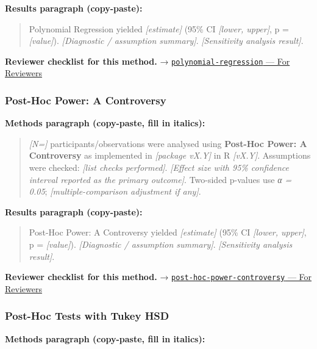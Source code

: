 \documentclass[
]{article}
\begin{document}
\textbf{Results paragraph (copy-paste):}

\begin{quote}
Polynomial Regression yielded \emph{{[}estimate{]}} (95\% CI
\emph{{[}lower, upper{]}}, p = \emph{{[}value{]}}). \emph{{[}Diagnostic
/ assumption summary{]}}. \emph{{[}Sensitivity analysis result{]}}.
\end{quote}

\textbf{Reviewer checklist for this method.} →
\href{../chapters/07-regression/polynomial-regression.Rmd\#for-reviewers}{\texttt{polynomial-regression}
--- For Reviewers}

\subsubsection{Post-Hoc Power: A
Controversy}\label{post-hoc-power-a-controversy}

\textbf{Methods paragraph (copy-paste, fill in italics):}

\begin{quote}
\emph{{[}N={]}} participants/observations were analysed using
\textbf{Post-Hoc Power: A Controversy} as implemented in
\emph{{[}package vX.Y{]}} in R \emph{{[}vX.Y{]}}. Assumptions were
checked: \emph{{[}list checks performed{]}}. \emph{{[}Effect size with
95\% confidence interval reported as the primary outcome{]}}. Two-sided
p-values use \emph{α = 0.05}; \emph{{[}multiple-comparison adjustment if
any{]}}.
\end{quote}

\textbf{Results paragraph (copy-paste):}

\begin{quote}
Post-Hoc Power: A Controversy yielded \emph{{[}estimate{]}} (95\% CI
\emph{{[}lower, upper{]}}, p = \emph{{[}value{]}}). \emph{{[}Diagnostic
/ assumption summary{]}}. \emph{{[}Sensitivity analysis result{]}}.
\end{quote}

\textbf{Reviewer checklist for this method.} →
\href{../chapters/05-power/post-hoc-power-controversy.Rmd\#for-reviewers}{\texttt{post-hoc-power-controversy}
--- For Reviewers}

\subsubsection{Post-Hoc Tests with Tukey
HSD}\label{post-hoc-tests-with-tukey-hsd}

\textbf{Methods paragraph (copy-paste, fill in italics):}
\end{document}
